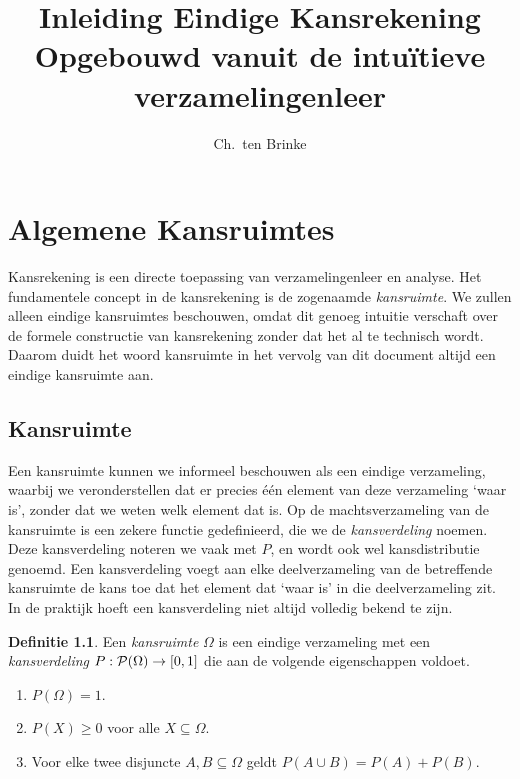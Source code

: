 \documentclass[a4paper]{book}
\title{Inleiding Eindige Kansrekening \\ \small{Opgebouwd vanuit de intu\"itieve verzamelingenleer}}
\author{Ch.\ ten Brinke}
\theoremstyle{definition}
\newtheorem{definition}[theorem]{Definitie}
\begin{document}
\maketitle

\chapter{Algemene Kansruimtes}
Kansrekening is een directe toepassing van verzamelingenleer en analyse.
Het fundamentele concept in de kansrekening is de zogenaamde \emph{kansruimte}.
We zullen alleen eindige kansruimtes beschouwen, omdat dit genoeg intuitie verschaft over de formele constructie van kansrekening zonder dat het al te
technisch wordt.
Daarom duidt het woord kansruimte in het vervolg van dit document altijd een eindige kansruimte aan.



\section{Kansruimte}
Een kansruimte kunnen we informeel beschouwen als een eindige verzameling, waarbij we veronderstellen dat er precies \'e\'en element van deze verzameling `waar is', zonder dat we weten welk element dat is.
Op de machtsverzameling van de kansruimte is een zekere functie gedefinieerd, die we de \emph{kansverdeling} noemen.
Deze kansverdeling noteren we vaak met $P$, en wordt ook wel kansdistributie genoemd.
Een kansverdeling voegt aan elke deelverzameling van de betreffende kansruimte de kans toe dat het element dat `waar is' in die deelverzameling zit.
In de praktijk hoeft een kansverdeling niet altijd volledig bekend te zijn.

\begin{definition}
    Een \emph{kansruimte} $\Omega$ is een eindige verzameling met een \emph{kansverdeling} $P: \powerset{\Omega} \to [0,1]$  die aan de volgende eigenschappen voldoet.
    \begin{enumerate}[i]
        \item $P(\Omega) = 1$.
        \item $P(X) \geq 0$ voor alle $X \subseteq \Omega$.
        \item Voor elke twee disjuncte $A,B \subseteq \Omega$ geldt $P(A \cup B) = P(A) + P(B)$.
    \end{enumerate}
\end{definition}
\end{document}
